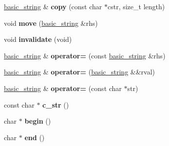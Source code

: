 \begin{DoxyCompactItemize}
\item 
\hyperlink{classgxx_1_1basic__string}{basic\+\_\+string} \& {\bfseries copy} (const char $\ast$cstr, size\+\_\+t length)\hypertarget{classgxx_1_1basic__string_ac8b82ed2e52861d91f85251513cb0793}{}\label{classgxx_1_1basic__string_ac8b82ed2e52861d91f85251513cb0793}

\item 
void {\bfseries move} (\hyperlink{classgxx_1_1basic__string}{basic\+\_\+string} \&rhs)\hypertarget{classgxx_1_1basic__string_a4b59fd59bc93889b0e883a8c46d74b2a}{}\label{classgxx_1_1basic__string_a4b59fd59bc93889b0e883a8c46d74b2a}

\item 
void {\bfseries invalidate} (void)\hypertarget{classgxx_1_1basic__string_a389fd4c801d67aa8a43c644d855cd1ba}{}\label{classgxx_1_1basic__string_a389fd4c801d67aa8a43c644d855cd1ba}

\item 
\hyperlink{classgxx_1_1basic__string}{basic\+\_\+string} \& {\bfseries operator=} (const \hyperlink{classgxx_1_1basic__string}{basic\+\_\+string} \&rhs)\hypertarget{classgxx_1_1basic__string_a4df36570d4a8de7d36f5f2b9c9bad840}{}\label{classgxx_1_1basic__string_a4df36570d4a8de7d36f5f2b9c9bad840}

\item 
\hyperlink{classgxx_1_1basic__string}{basic\+\_\+string} \& {\bfseries operator=} (\hyperlink{classgxx_1_1basic__string}{basic\+\_\+string} \&\&rval)\hypertarget{classgxx_1_1basic__string_a0d1d5ff080536bfc807a9921d25d3717}{}\label{classgxx_1_1basic__string_a0d1d5ff080536bfc807a9921d25d3717}

\item 
\hyperlink{classgxx_1_1basic__string}{basic\+\_\+string} \& {\bfseries operator=} (const char $\ast$str)\hypertarget{classgxx_1_1basic__string_a410f48c9f9907d8195007fc01388dd1a}{}\label{classgxx_1_1basic__string_a410f48c9f9907d8195007fc01388dd1a}

\item 
const char $\ast$ {\bfseries c\+\_\+str} ()\hypertarget{classgxx_1_1basic__string_a2410cc6b56b44ac06d7bcfa6e33c4afd}{}\label{classgxx_1_1basic__string_a2410cc6b56b44ac06d7bcfa6e33c4afd}

\item 
char $\ast$ {\bfseries begin} ()\hypertarget{classgxx_1_1basic__string_a19e4a5799d86b98308bfb12a146b8de5}{}\label{classgxx_1_1basic__string_a19e4a5799d86b98308bfb12a146b8de5}

\item 
char $\ast$ {\bfseries end} ()\hypertarget{classgxx_1_1basic__string_af92b9ebe9e0b441e6c7d31c19357692f}{}\label{classgxx_1_1basic__string_af92b9ebe9e0b441e6c7d31c19357692f}


\end{DoxyCompactItemize}
